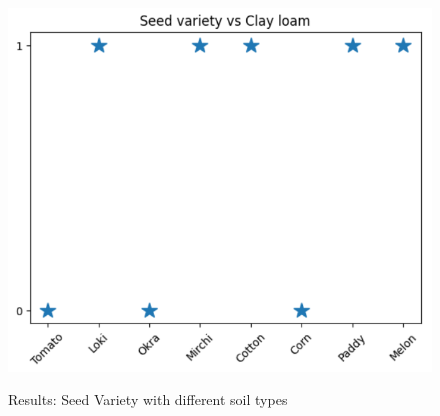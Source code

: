 \documentclass[conference]{IEEEtran}
\begin{document}
\begin{figure}[h!]
{    \includegraphics[scale=0.35]{plot14.png}
 }
\caption{Results: Seed Variety with different soil types}
\vspace{-0.1in}
\label{res1}
 \end{figure}




\end{document}
